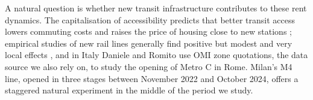 %
%
%



A natural question is whether new transit infrastructure contributes to these rent dynamics. %
The capitalisation of accessibility predicts that better transit access lowers commuting costs and raises the price of housing close to new stations \cite{alonso1964,gibbons2005}; empirical studies of new rail lines generally find positive but modest and very local effects \cite{billings2011}, and in Italy Daniele and Romito \cite{daniele2022} use OMI zone quotations, the data source we also rely on, to study the opening of Metro C in Rome. Milan's M4 line, opened in three stages between November 2022 and October 2024, offers a staggered natural experiment in the middle of the period we study.

